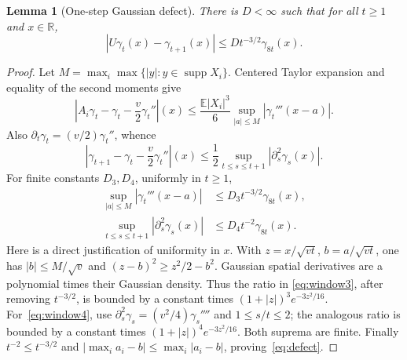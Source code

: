 \documentclass[11pt]{article}
\newtheorem{lemma}[theorem]{Lemma}
\newcommand{\E}{\mathbb E}
\newcommand{\R}{\mathbb R}
\begin{document}
\begin{lemma}[One-step Gaussian defect]\label{lem:defect}
There is $D<\infty$ such that for all $t\ge1$ and $x\in\R$,
\begin{equation}\label{eq:defect}
 |U\gamma_t(x)-\gamma_{t+1}(x)|
 \le D t^{-3/2}\gamma_{8t}(x).
\end{equation}
\end{lemma}
\begin{proof}
Let $M=\max_i\max\{|y|:y\in\operatorname{supp}X_i\}$.
Centered Taylor expansion and equality of the second moments give
\[
 \left|A_i\gamma_t-\gamma_t-\frac v2\gamma_t''\right|(x)
 \le\frac{\E|X_i|^3}{6}
       \sup_{|a|\le M}|\gamma_t'''(x-a)|.
\]
Also $\partial_t\gamma_t=(v/2)\gamma_t''$, whence
\[
 \left|\gamma_{t+1}-\gamma_t-\frac v2\gamma_t''\right|(x)
 \le\frac12\sup_{t\le s\le t+1}|\partial_s^2\gamma_s(x)|.
\]
For finite constants $D_3,D_4$, uniformly in $t\ge1$,
\begin{align}
 \sup_{|a|\le M}|\gamma_t'''(x-a)|
    &\le D_3t^{-3/2}\gamma_{8t}(x),\label{eq:window3}\\
 \sup_{t\le s\le t+1}|\partial_s^2\gamma_s(x)|
    &\le D_4t^{-2}\gamma_{8t}(x).\label{eq:window4}
\end{align}
Here is a direct justification of uniformity in $x$. With
$z=x/\sqrt{vt}$, $b=a/\sqrt{vt}$, one has $|b|\le M/\sqrt v$
and $(z-b)^2\ge z^2/2-b^2$. Gaussian spatial derivatives are a
polynomial times their Gaussian density. Thus the ratio in
\eqref{eq:window3}, after removing $t^{-3/2}$, is bounded by a
constant times $(1+|z|)^3e^{-3z^2/16}$. For~\eqref{eq:window4},
use $\partial_s^2\gamma_s=(v^2/4)\gamma_s''''$ and
$1\le s/t\le2$; the analogous ratio is bounded by a constant times
$(1+|z|)^4e^{-3z^2/16}$. Both suprema are finite.
Finally $t^{-2}\le t^{-3/2}$ and
$|\max_i a_i-b|\le\max_i|a_i-b|$, proving~\eqref{eq:defect}.
\end{proof}
\end{document}
